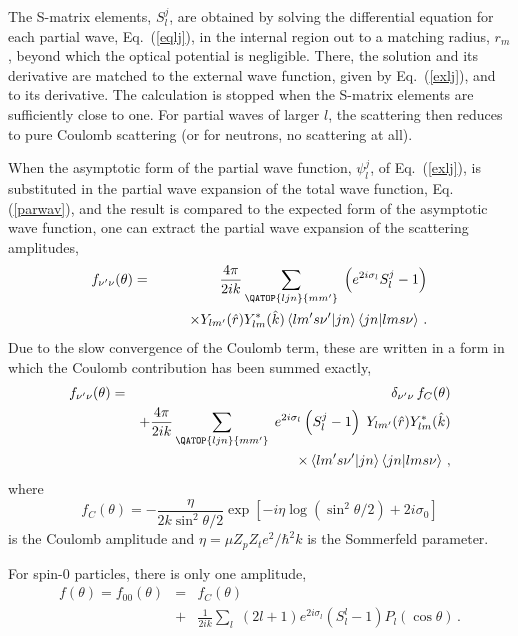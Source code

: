 The S-matrix elements, $S_{l}^{j}$, are obtained by solving the differential
equation for each partial wave, Eq.~(\ref{eqlj}), in the internal region out
to a matching radius, $r_{m}$, beyond which the optical potential is
negligible. There, the solution and its derivative are matched to the
external wave function, given by Eq.~(\ref{exlj}), and to its derivative.
The calculation is stopped when the S-matrix elements are sufficiently close
to one. For partial waves of larger $l$, the scattering then reduces to pure
Coulomb scattering (or for neutrons, no scattering at all).

When the asymptotic form of the partial wave function, $\psi_{l}^{j}$, of
Eq.~(\ref{exlj}), is substituted in the partial wave expansion of the total
wave function, Eq. (\ref{parwav}), and the result is compared to the
expected form of the asymptotic wave function, one can extract the partial
wave expansion of the scattering amplitudes,
\begin{eqnarray}
f_{\nu^{\prime}\nu}(\theta) & = & \frac{4\pi}{2ik}\sum_{{{\QATOP{ljn}{%
mm^{\prime}}}}}\;\left(e^{2i\sigma_{l}}S_{l}^{j}-1\right) \\
& & \qquad\times Y_{lm^{\prime}}(\hat{r})Y_{lm}^{*}(\hat{k})\left\langle
lm^{\prime}s\nu^{\prime}|jn\right\rangle \left\langle jn|lms\nu\right\rangle
\,.  \nonumber
\end{eqnarray}
Due to the slow convergence of the Coulomb term, these are written in a form
in which the Coulomb contribution has been summed exactly,%
\begin{eqnarray}
f_{\nu^{\prime}\nu}(\theta) & = & \delta_{\nu^{\prime}\nu}\, f_{C}(\theta) \\
& & +\frac{4\pi}{2ik}\sum_{{{\QATOP{ljn}{mm^{\prime}}}}}\;
e^{2i\sigma_{l}}\left(S_{l}^{j}-1\right)\; Y_{lm^{\prime}}(\hat{r}%
)Y_{lm}^{*}(\hat{k})  \nonumber \\
& & \qquad\qquad\times\left\langle lm^{\prime}s\nu^{\prime}|jn\right\rangle
\left\langle jn|lms\nu\right\rangle \,,  \nonumber
\end{eqnarray}
where
\begin{equation}
f_{C}(\theta)=-\frac{\eta}{2k\sin^{2}\theta/2}\exp\left[-i\eta\log\left(%
\sin^{2}\theta/2\right)+2i\sigma_{0}\right]
\end{equation}
is the Coulomb amplitude and $\eta=\mu Z_p Z_t e^2/\hbar^2 k $ is the
Sommerfeld parameter.

For spin-0 particles, there is only one amplitude,
\begin{eqnarray}
f(\theta)=f_{00}(\theta) & = & f_{C}(\theta) \\
& + & \frac{1}{2ik}\sum_{l}\;(2l+1)e^{2i\sigma_{l}}(S_{l}^{l}-1)P_{l}(\cos%
\theta)\,.  \nonumber
\end{eqnarray}

